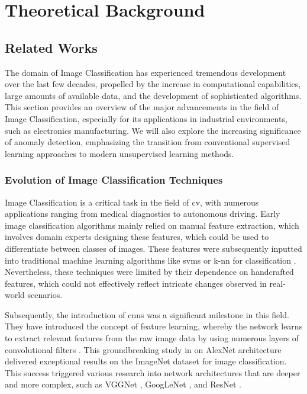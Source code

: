 \section{Theoretical Background}

\subsection{Related Works}

The domain of Image Classification has experienced tremendous development over the last few decades, propelled by the increase in computational capabilities, large amounts of available data, and the development of sophisticated algorithms. This section provides an overview of the major advancements in the field of Image Classification, especially for its applications in industrial environments, such as electronics manufacturing. We will also explore the increasing significance of anomaly detection, emphasizing the transition from conventional supervised learning approaches to modern unsupervised learning methods.

\subsubsection{Evolution of Image Classification Techniques}

Image Classification is a critical task in the field of \gls{cv}, with numerous applications ranging from medical diagnostics to autonomous driving. Early image classification algorithms mainly relied on manual feature extraction, which involves domain experts designing these features, which could be used to differentiate between classes of images. These features were subsequently inputted into traditional machine learning algorithms like \glspl{svm} or \gls{k-nn} for classification \cite{LeCun2015}. Nevertheless, these techniques were limited by their dependence on handcrafted features, which could not effectively reflect intricate changes observed in real-world scenarios.

Subsequently, the introduction of \glspl{cnn} was a significant milestone in this field. They have introduced the concept of feature learning, whereby the network learns to extract relevant features from the raw image data by using numerous layers of convolutional filters \cite{NIPS2012_c399862d}. This groundbreaking study in \cite{NIPS2012_c399862d} on AlexNet architecture delivered exceptional results on the ImageNet dataset for image classification. This success triggered various research into network architectures that are deeper and more complex, such as VGGNet \cite{simonyan2015deepconvolutionalnetworkslargescale}, GoogLeNet \cite{7298594}, and ResNet \cite{he2016deep}.

